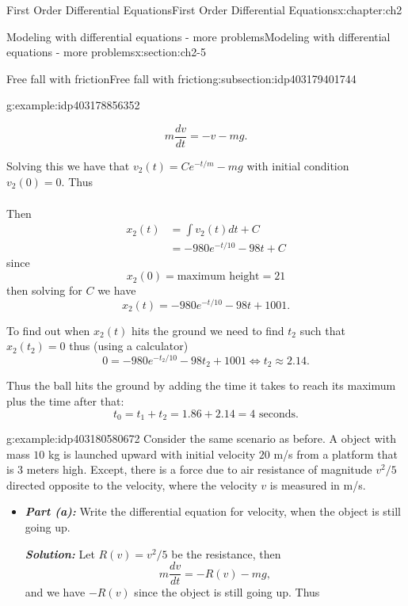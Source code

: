 \documentclass[oneside,10pt,]{book}
\newcommand{\alert}[1]{\textbf{\textit{#1}}}
\numberwithin{equation}{section}
\numberwithin{equation}{section}
\newcommand{\amp}{&}
\begin{document}
\begin{chapterptx}{First Order Differential Equations}{}{First Order Differential Equations}{}{}{x:chapter:ch2}
\begin{sectionptx}{Modeling with differential equations - more problems}{}{Modeling with differential equations - more problems}{}{}{x:section:ch2-5}
\begin{subsectionptx}{Free fall with friction}{}{Free fall with friction}{}{}{g:subsection:idp403179401744}
\begin{example}{}{g:example:idp403178856352}
\begin{itemize}[label=\textbullet]
\begin{equation*}
m\frac{dv}{dt}=-v-mg.
\end{equation*}
%
\par
Solving this we have that \(v_{2}(t)=Ce^{-t/m}-mg\) with initial condition \(v_{2}(0)=0\). Thus%
\begin{align*}
\end{align*}
%
\par
Then%
\begin{align*}
x_{2}(t) \amp =\int v_{2}(t)dt+C\\
\amp =-980e^{-t/10}-98t+C
\end{align*}
since%
\begin{equation*}
x_{2}(0)=\text{maximum height}=21
\end{equation*}
then solving for \(C\) we have%
\begin{equation*}
x_{2}(t)=-980e^{-t/10}-98t+1001.
\end{equation*}
%
\par
To find out when \(x_{2}(t)\) hits the ground we need to find \(t_{2}\) such that \(x_{2}(t_{2})=0\) thus (using a calculator)%
\begin{equation*}
0=-980e^{-t_{2}/10}-98t_{2}+1001\iff t_{2}\approx2.14.
\end{equation*}
%
\par
Thus the ball hits the ground by adding the time it takes to reach its maximum plus the time after that:%
\begin{equation*}
t_{0}=t_{1}+t_{2}=1.86+2.14=4\text{ seconds}.
\end{equation*}
%
\end{itemize}
\end{example}
\begin{example}{}{g:example:idp403180580672}%
Consider the same scenario as before. A object with mass \(10\) kg is launched upward with initial velocity \(20\) m\slash{}s from a platform that is \(3\) meters high. Except, there is a force due to air resistance of magnitude \(v^{2}/5\) directed opposite to the velocity, where the velocity \(v\) is measured in m\slash{}s.%
%
\begin{itemize}[label=\textbullet]
\item{}\alert{Part (a):} Write the differential equation for velocity, when the object is still going up.%
\par
\alert{Solution:} Let \(R(v)=v^{2}/5\) be the resistance, then%
\begin{equation*}
m\frac{dv}{dt}=-R(v)-mg,
\end{equation*}
and we have \(-R(v)\) since the object is still going up. Thus%

\end{itemize}
\end{example}
\end{subsectionptx}
\end{sectionptx}
\end{chapterptx}
\end{document}
